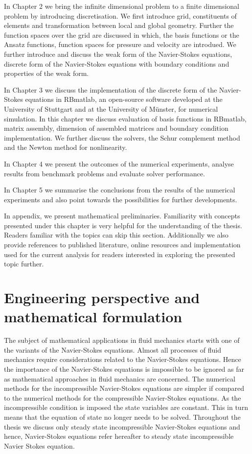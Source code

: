 \documentclass[a4paper,twoside,openright]{book}
\begin{document}
In Chapter 2 we bring the infinite dimensional problem to a finite dimensional problem by introducing discretisation. We first introduce grid, constituents of elements and transformation between local and global geometry. Further the function spaces over the grid are discussed in which, the basis functions or the Ansatz functions, function spaces for pressure and velocity are introdued. We further introduce and discuss the weak form of the Navier-Stokes equations, discrete form of the Navier-Stokes equations with boundary conditions and properties of the weak form.

In Chapter 3 we discuss the implementation of the discrete form of the Navier- Stokes equations in RBmatlab, an open-source software developed at the University of Stuttgart and at the University of M\"unster, for numerical simulation. In this chapter we discuss evaluation of basis functions in RBmatlab, matrix assembly, dimension of assembled matrices and boundary condition implementation. We further discuss the solvers, the Schur complement method and the Newton method for nonlinearity.

In Chapter 4 we present the outcomes of the numerical experiments, analyse results from benchmark problems and evaluate solver performance.

In Chapter 5 we summarise the conclusions from the results of the numerical experiments and also point towards the possibilities for further developments.

In appendix, we present mathematical preliminaries. Familiarity with concepts presented under this chapter is very helpful for the understanding of the thesis. Readers familiar with the topics can skip this section. Additionally we also provide references to published literature, online resources and implementation used for the current analysis for readers interested in exploring the presented topic further.

\newpage

\chapter[Perspective and formulation]{Engineering perspective and mathematical formulation} 

The subject of mathematical applications in fluid mechanics starts with  one of the variants of the Navier-Stokes equations. Almost all processes of fluid mechanics require considerations related to the Navier-Stokes equations. Hence the importance of the Navier-Stokes equations is impossible to be ignored as far as mathematical approaches in fluid mechanics are concerned. The numerical methods for the incompressible Navier-Stokes equations are simpler if compared to the numerical methods for the compressible Navier-Stokes equations. As the incompressible condition is imposed the state variables are constant. This in turn means that the equation of state no longer needs to be solved. Throughout the thesis we discuss only steady state incompressible Navier-Stokes equations and hence, Navier-Stokes equations refer hereafter to steady state incompressible Navier Stokes equation.
\end{document}
